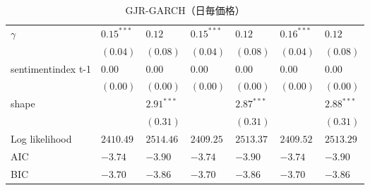\begin{landscape}
\begin{table}[]
\begin{tabular}{lllllll}
$\gamma$           & $0.15^{***}$ & $0.12$       & $0.15^{***}$ & $0.12$       & $0.16^{***}$ & $0.12$       \\
                   & $(0.04)$     & $(0.08)$     & $(0.04)$     & $(0.08)$     & $(0.04)$     & $(0.08)$     \\
sentimentindex t-1 & $0.00$       & $0.00$       & $0.00$       & $0.00$       & $0.00$       & $0.00$       \\
                   & $(0.00)$     & $(0.00)$     & $(0.00)$     & $(0.00)$     & $(0.00)$     & $(0.00)$     \\
shape              &              & $2.91^{***}$ &              & $2.87^{***}$ &              & $2.88^{***}$ \\
                   &              & $(0.31)$     &              & $(0.31)$     &              & $(0.31)$     \\ \hline
Log likelihood     & $2410.49$    & $2514.46$    & $2409.25$    & $2513.37$    & $2409.52$    & $2513.29$    \\
AIC                & $-3.74$      & $-3.90$      & $-3.74$      & $-3.90$      & $-3.74$      & $-3.90$      \\
BIC                & $-3.70$      & $-3.86$      & $-3.70$      & $-3.86$      & $-3.70$      & $-3.86$      \\ \hline
\end{tabular}
\caption{GJR-GARCH（日毎価格）}
\end{table}
\end{landscape}








